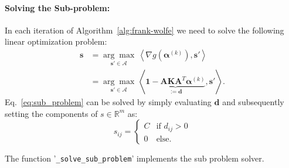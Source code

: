 \documentclass{article}
\newcommand{\defi}{:=}
\newcommand{\balpha}{\boldsymbol{\alpha}}
\newcommand{\bones}{\mathbf{1}}
\newcommand{\numpair}{m}
\begin{document}
\paragraph{Solving the Sub-problem:}
In each iteration of Algorithm~\ref{alg:frank-wolfe} we need to solve the following linear optimization problem:
\begin{align}
    \mathbf{s}
        &=\underset{\mathbf{s}'\in\mathcal{A}}{\arg\max}\,\left\langle\nabla g(\balpha^{(k)}),\mathbf{s}'\right\rangle\\
        &=\underset{\mathbf{s}'\in\mathcal{A}}{\arg\max}\,\left\langle\underbrace{\bones-\mathbf{A}\mathbf{K}\mathbf{A}^T\balpha^{(k)}}_{\defi\mathbf{d}},\mathbf{s}'\right\rangle.\label{eq:sub_problem}
\end{align}
Eq.~\eqref{eq:sub_problem} can be solved by simply evaluating $\mathbf{d}$ and subsequently setting the components of $s\in\mathbb{R}^{\numpair}$ as:
\begin{equation}
    s_{ij}=\begin{cases}
            C&\text{if }d_{ij}>0\\
            0&\text{else}.
           \end{cases}
\end{equation}
\begin{mdframed}[style=codeframe]
    The function '\texttt{\_solve\_sub\_problem}' implements the sub problem solver.
\end{mdframed}
\end{document}
